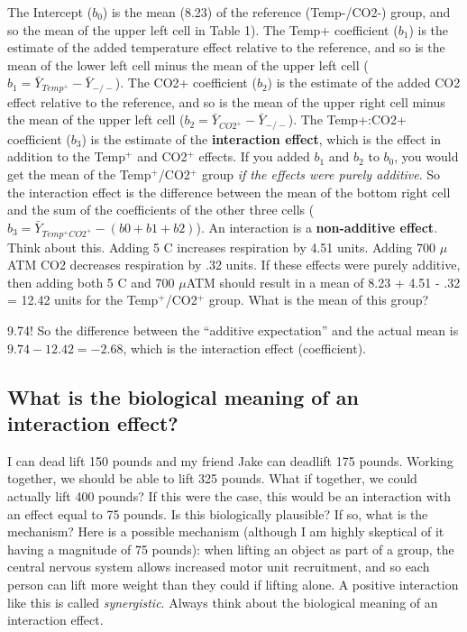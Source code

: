 \documentclass[]{book}
\begin{document}
The Intercept (\(b_0\)) is the mean (8.23) of the reference (Temp-/CO2-)
group, and so the mean of the upper left cell in Table 1). The Temp+
coefficient (\(b_1\)) is the estimate of the added temperature effect
relative to the reference, and so is the mean of the lower left cell
minus the mean of the upper left cell
(\(b_1=\bar{Y}_{Temp^+}-\bar{Y}_{-/-}\)). The CO2+ coefficient (\(b_2\))
is the estimate of the added CO2 effect relative to the reference, and
so is the mean of the upper right cell minus the mean of the upper left
cell (\(b_2=\bar{Y}_{CO2^+}-\bar{Y}_{-/-}\)). The Temp+:CO2+ coefficient
(\(b_3\)) is the estimate of the \textbf{interaction effect}, which is
the effect in addition to the Temp\(^+\) and CO2\(^+\) effects. If you
added \(b_1\) and \(b_2\) to \(b_0\), you would get the mean of the
Temp\(^+\)/CO2\(^+\) group \emph{if the effects were purely additive}.
So the interaction effect is the difference between the mean of the
bottom right cell and the sum of the coefficients of the other three
cells (\(b_3 = \bar{Y}_{Temp^+CO2^+} - (b0 + b1 + b2)\)). An interaction
is a \textbf{non-additive effect}. Think about this. Adding 5 C
increases respiration by 4.51 units. Adding 700 \(\mu\)ATM CO2 decreases
respiration by .32 units. If these effects were purely additive, then
adding both 5 C and 700 \(\mu\)ATM should result in a mean of 8.23 +
4.51 - .32 = 12.42 units for the Temp\(^+\)/CO2\(^+\) group. What is the
mean of this group?

9.74! So the difference between the ``additive expectation'' and the
actual mean is \(9.74 - 12.42 = -2.68\), which is the interaction effect
(coefficient).

\subsection{What is the biological meaning of an interaction
effect?}\label{what-is-the-biological-meaning-of-an-interaction-effect}

I can dead lift 150 pounds and my friend Jake can deadlift 175 pounds.
Working together, we should be able to lift 325 pounds. What if
together, we could actually lift 400 pounds? If this were the case, this
would be an interaction with an effect equal to 75 pounds. Is this
biologically plausible? If so, what is the mechanism? Here is a possible
mechanism (although I am highly skeptical of it having a magnitude of 75
pounds): when lifting an object as part of a group, the central nervous
system allows increased motor unit recruitment, and so each person can
lift more weight than they could if lifting alone. A positive
interaction like this is called \emph{synergistic}. Always think about
the biological meaning of an interaction effect.
\end{document}
